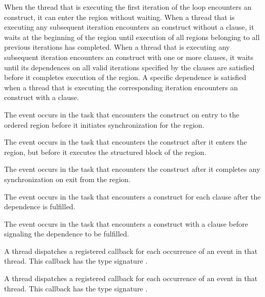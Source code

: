 When the thread that is executing the first iteration of the loop encounters an
 construct, it can enter the  region without
waiting. When a thread that is executing any subsequent iteration encounters an
 construct without a  clause, it waits at the
beginning of the  region until execution of all 
regions belonging to all previous iterations has completed. When a thread that
is executing any subsequent iteration encounters an  construct with
one or more {} clauses, it waits until its dependences 
on all valid iterations specified by the  clauses are satisfied before 
it completes execution of the  region. A specific dependence is 
satisfied when a thread that is executing the corresponding iteration encounters 
an  construct with a  clause.

\events

The  event occurs in the task that encounters the
 construct on entry to the ordered region before it initiates 
synchronization for the region.

The  event occurs in the task that encounters the
 construct after it enters the region, but before it executes the
structured block of the  region.

The  event occurs in the task that encounters the
 construct after it completes any synchronization on exit 
from the  region.

The  event occurs in the task that encounters a
 construct for each {}
clause after the dependence is fulfilled.

The  event occurs in the task that encounters a
 construct with a {} 
clause before signaling the dependence to be fulfilled.

\tools

A thread dispatches a registered  callback 
for each occurrence of an  event in that thread. This 
callback has the type signature .

A thread dispatches a registered  callback 
for each occurrence of an  event in that thread. This 
callback has the type signature .

